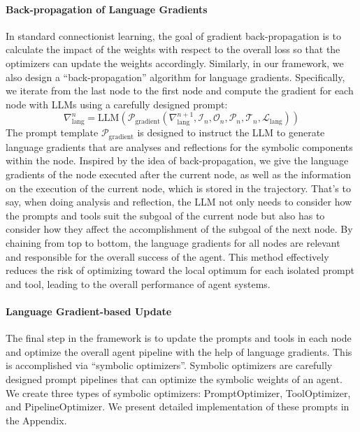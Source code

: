 \documentclass{article}
\newcommand{\LanguageLoss}{\mathcal{L}_{\text{lang}}}
\newcommand{\NodeInput}{\mathcal{I}_n}
\newcommand{\NodeOutput}{\mathcal{O}_n}
\newcommand{\NodePrompt}{\mathcal{P}_n}
\newcommand{\NodeTool}{\mathcal{T}_n}
\newcommand{\NodeGradient}{\nabla_{\text{lang}}^n}
\newcommand{\PreviousNodeGradient}{\nabla_{\text{lang}}^{n+1}}
\begin{document}
\paragraph{Back-propagation of Language Gradients}
In standard connectionist learning, the goal of gradient back-propagation is to calculate the impact of the weights with respect to the overall loss so that the optimizers can update the weights accordingly. Similarly, in our framework, we also design a ``back-propagation'' algorithm for language gradients. Specifically, we iterate from the last node to the first node and compute the gradient for each node with LLMs using a carefully designed prompt: 
\begin{equation}
    \NodeGradient = \text{LLM}(\mathcal{P}_{\text{gradient}}(\PreviousNodeGradient, \NodeInput, \NodeOutput, \NodePrompt, \NodeTool, \LanguageLoss))
\end{equation}
The prompt template $\mathcal{P}_{\text{gradient}}$ is designed to instruct the LLM to generate language gradients that are analyses and reflections for the symbolic components within the node. Inspired by the idea of back-propagation, we give the language gradients of the node executed after the current node, as well as the information on the execution of the current node, which is stored in the trajectory. That's to say, when doing analysis and reflection, the LLM not only needs to consider how the prompts and tools suit the subgoal of the current node but also has to consider how they affect the accomplishment of the subgoal of the next node. By chaining from top to bottom, the language gradients for all nodes are relevant and responsible for the overall success of the agent. This method effectively reduces the risk of optimizing toward the local optimum for each isolated prompt and tool, leading to the overall performance of agent systems. 

\paragraph{Language Gradient-based Update}
The final step in the framework is to update the prompts and tools in each node and optimize the overall agent pipeline with the help of language gradients. This is accomplished via ``symbolic optimizers''. Symbolic optimizers are carefully designed prompt pipelines that can optimize the symbolic weights of an agent. We create three types of symbolic optimizers: PromptOptimizer, ToolOptimizer, and PipelineOptimizer. We present detailed implementation of these prompts in the Appendix.
\end{document}

